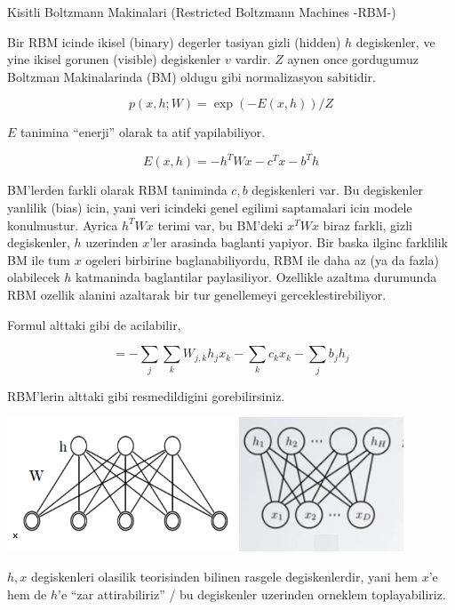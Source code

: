 \documentclass[12pt,fleqn]{article}\usepackage{../common}
\begin{document}
Kisitli Boltzmann Makinalari (Restricted Boltzmann Machines -RBM-)

Bir RBM icinde ikisel (binary) degerler tasiyan gizli (hidden) $h$
degiskenler, ve yine ikisel gorunen (visible) degiskenler $v$ vardir. $Z$
aynen once gordugumuz Boltzman Makinalarinda (BM) oldugu gibi normalizasyon
sabitidir.

$$ p(x,h;W) = \exp (-E(x,h)) / Z $$

$E$ tanimina ``enerji'' olarak ta atif yapilabiliyor.

$$ E(x,h) = -h^TWx - c^Tx - b^Th $$

BM'lerden farkli olarak RBM taniminda $c,b$ degiskenleri var. Bu
degiskenler yanlilik (bias) icin, yani veri icindeki genel egilimi
saptamalari icin modele konulmustur. Ayrica $h^TWx$ terimi var, bu BM'deki
 $x^TWx$ biraz farkli, gizli degiskenler, $h$ uzerinden $x$'ler arasinda
baglanti yapiyor. Bir baska ilginc farklilik BM ile tum $x$ ogeleri
birbirine baglanabiliyordu, RBM ile daha az (ya da fazla) olabilecek $h$
katmaninda baglantilar paylasiliyor. Ozellikle azaltma durumunda RBM
ozellik alanini azaltarak bir tur genellemeyi gerceklestirebiliyor.

Formul alttaki gibi de acilabilir,

$$ = - \sum_j \sum_k W_{j,k}h_jx_k - \sum_k c_kx_k - \sum_j b_jh_j  $$

RBM'lerin alttaki gibi resmedildigini gorebilirsiniz.

\includegraphics[height=4cm]{rbm_01.png}
\includegraphics[height=4cm]{rbm_02.png}

$h,x$ degiskenleri olasilik teorisinden bilinen rasgele degiskenlerdir,
yani hem $x$'e hem de $h$'e ``zar attirabiliriz'' / bu degiskenler
uzerinden orneklem toplayabiliriz. 
\end{document}
